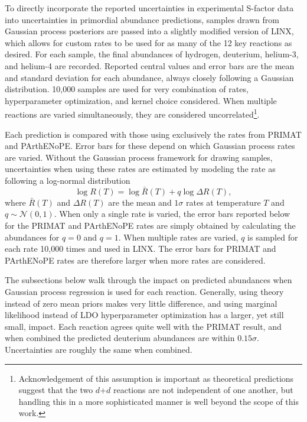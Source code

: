 \documentclass[%
 reprint,
superscriptaddress,
nofootinbib,
 amsmath,amssymb,
 aps,
 pra,
]{revtex4-2}
\begin{document}
To directly incorporate the reported uncertainties in experimental S-factor data into uncertainties in primordial abundance predictions, samples drawn from Gaussian process posteriors are passed into a slightly modified version of LINX, which allows for custom rates to be used for as many of the 12 key reactions as desired. For each sample, the final abundances of hydrogen, deuterium, helium-3, and helium-4 are recorded. Reported central values and error bars are the mean and standard deviation for each abundance, always closely following a Gaussian distribution. 10,000 samples are used for very combination of rates, hyperparameter optimization, and kernel choice considered. When multiple reactions are varied simultaneously, they are considered uncorrelated\footnote{Acknowledgement of this assumption is important as theoretical predictions suggest that the two $d$+$d$ reactions are not independent of one another, but handling this in a more sophisticated manner is well beyond the scope of this work.}. 

Each prediction is compared with those using exclusively the rates from PRIMAT and PArthENoPE. Error bars for these depend on which Gaussian process rates are varied. Without the Gaussian process framework for drawing samples, uncertainties when using these rates are estimated by modeling the rate as following a log-normal distribution
\begin{equation}
	\log R(T) = \log \bar{R}(T) + q \log \Delta R(T), \nonumber
\end{equation}
where $\bar{R}(T)$ and $\Delta R(T)$ are the mean and $1\sigma$ rates at temperature $T$ and $q\sim\mathcal{N}(0,1)$. When only a single rate is varied, the error bars reported below for the PRIMAT and PArthENoPE rates are simply obtained by calculating the abundances for $q=0$ and $q=1$. When multiple rates are varied, $q$ is sampled for each rate 10,000 times and used in LINX. The error bars for PRIMAT and PArthENoPE rates are therefore larger when more rates are considered. 

The subsections below walk through the impact on predicted abundances when Gaussian process regression is used for each reaction. Generally, using theory instead of zero mean priors makes very little difference, and using marginal likelihood instead of LDO hyperparameter optimization has a larger, yet still small, impact. Each reaction agrees quite well with the PRIMAT result, and when combined the predicted deuterium abundances are within $0.15\sigma$. Uncertainties are roughly the same when combined.
\end{document}
